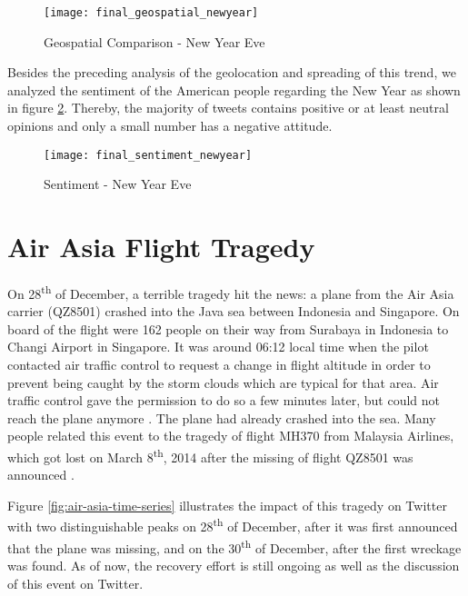 \begin{figure}[H]
  \centering
        \texttt{[image: final\_geospatial\_newyear]}
  \caption[Geospatial Comparison - New Year Eve]{Geospatial Comparison - New Year Eve}
  \label{fig:new-year-heat-map}
  \vspace{-1.3em}
\end{figure}

Besides the preceding analysis of the geolocation and spreading of this trend, we analyzed the sentiment of the American people regarding the New Year as shown in figure \ref{fig:new-year-sentiment}. Thereby, the majority of tweets contains positive or at least neutral opinions and only a small number has a negative attitude.

\begin{figure}[H]
  \centering
        \texttt{[image: final\_sentiment\_newyear]}
  \caption[Sentiment - New Year Eve]{Sentiment - New Year Eve}
  \label{fig:new-year-sentiment}
  \vspace{-1.3em}
\end{figure}


\section{Air Asia Flight Tragedy}
\label{sec:air-asia-flight-tragedy}
On 28\textsuperscript{th} of December, a terrible tragedy hit the news: a plane from the Air Asia carrier (QZ8501) crashed into the Java sea between Indonesia and Singapore. On board of the flight were 162 people on their way from Surabaya in Indonesia to Changi Airport in Singapore. It was around 06:12 local time when the pilot contacted air traffic control to request a change in flight altitude in order to prevent being caught by the storm clouds which are typical for that area. Air traffic control gave the permission to do so a few minutes later, but could not reach the plane anymore \cite{bbc2014flight}. The plane had already crashed into the sea. Many people related this event to the tragedy of flight MH370 from Malaysia Airlines, which got lost on March 8\textsuperscript{th}, 2014 after the missing of flight QZ8501 was announced \cite{nbc2014by}.

Figure \ref{fig:air-asia-time-series} illustrates the impact of this tragedy on Twitter with two distinguishable peaks on 28\textsuperscript{th} of December, after it was first announced that the plane was missing, and on the 30\textsuperscript{th} of December, after the first wreckage was found. As of now, the recovery effort is still ongoing as well as the discussion of this event on Twitter.

